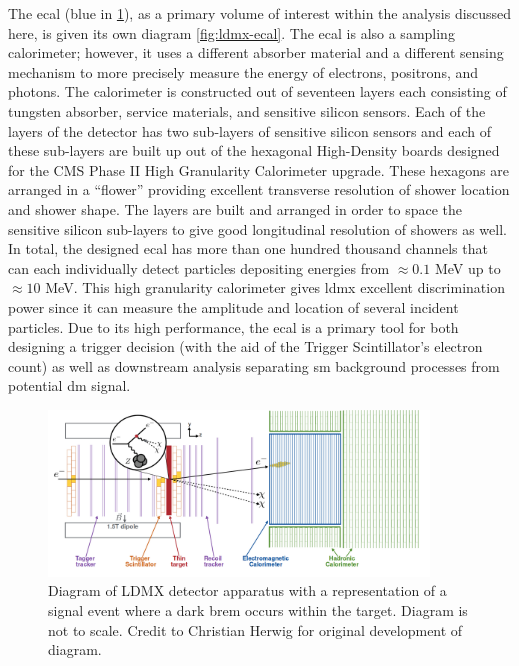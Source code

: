 The \ac{ecal} (blue in \cref{fig:ldmx-det}), as a primary volume of interest within the analysis
discussed here, is given its own diagram \cref{fig:ldmx-ecal}. The \ac{ecal} is also a sampling
calorimeter; however, it uses a different absorber material and a different sensing mechanism to
more precisely measure the energy of electrons, positrons, and photons. The calorimeter is constructed
out of seventeen layers each consisting of tungsten absorber, service materials, and sensitive silicon
sensors. Each of the layers of the detector has two sub-layers of sensitive silicon sensors and each
of these sub-layers are built up out of the hexagonal High-Density boards designed for the CMS
Phase II High Granularity Calorimeter upgrade\cite{cms-phase-2-tdr}. These hexagons are arranged in a ``flower''
providing excellent transverse resolution of shower location and shower shape. The layers are built
and arranged in order to space the sensitive silicon sub-layers to give good longitudinal resolution
of showers as well. In total, the designed \ac{ecal} has more than one hundred thousand channels that
can each individually detect particles depositing energies from $\approx 0.1$ MeV up to
$\approx 10$ MeV.
This high granularity calorimeter gives \ac{ldmx} excellent discrimination power
since it can measure the amplitude and location of several incident particles.
Due to its high performance, the \ac{ecal} is a primary tool for
both designing a trigger decision (with the aid of the Trigger Scintillator's electron count) as well
as downstream analysis separating \ac{sm} background processes from potential \ac{dm} signal.

\begin{figure}
  \centering
  \includegraphics[width=0.9\textwidth]{figures/ldmx/experiment/detector.png}
  \caption{
    Diagram of LDMX detector apparatus with a representation of a signal event where
    a dark brem occurs within the target. Diagram is not to scale. Credit to Christian Herwig
    for original development of diagram.
  }
  \label{fig:ldmx-det}
\end{figure}


